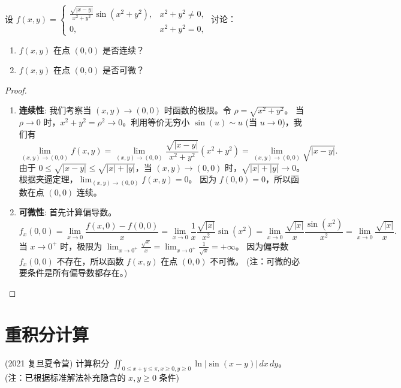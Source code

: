 \documentclass[lang=cn,10pt,thmcnt=section]{elegantbook}
\begin{document}
\begin{example}
    设 $f(x, y) = \begin{cases} \frac{\sqrt{|x - y|}}{x^2 + y^2} \sin(x^2 + y^2), & x^2 + y^2 \neq 0, \\ 0, & x^2 + y^2 = 0, \end{cases}$
讨论：
\begin{enumerate}
\item $f(x, y)$ 在点 $(0, 0)$ 是否连续？
\item $f(x, y)$ 在点 $(0, 0)$ 是否可微？
\end{enumerate}
\end{example}
\begin{proof}
\begin{enumerate}
    \item \textbf{连续性}:
    我们考察当 $(x,y) \to (0,0)$ 时函数的极限。令 $\rho = \sqrt{x^2+y^2}$。
    当 $\rho \to 0$ 时，$x^2+y^2 = \rho^2 \to 0$。利用等价无穷小 $\sin(u) \sim u$ (当 $u\to 0$)，我们有
    \[
    \lim_{(x,y)\to(0,0)} f(x,y) = \lim_{(x,y)\to(0,0)} \frac{\sqrt{|x-y|}}{x^2+y^2} (x^2+y^2) = \lim_{(x,y)\to(0,0)} \sqrt{|x-y|}.
    \]
    由于 $0 \le \sqrt{|x-y|} \le \sqrt{|x|+|y|}$，当 $(x,y)\to(0,0)$ 时，$\sqrt{|x|+|y|} \to 0$。
    根据夹逼定理，$\lim_{(x,y)\to(0,0)} f(x,y) = 0$。
    因为 $f(0,0)=0$，所以函数在点 $(0,0)$ 连续。

    \item \textbf{可微性}:
    首先计算偏导数。
    \[
    f_x(0,0) = \lim_{x\to 0} \frac{f(x,0)-f(0,0)}{x} = \lim_{x\to 0} \frac{1}{x} \frac{\sqrt{|x|}}{x^2}\sin(x^2) = \lim_{x\to 0} \frac{\sqrt{|x|}}{x} \frac{\sin(x^2)}{x^2} = \lim_{x\to 0} \frac{\sqrt{|x|}}{x}.
    \]
    当 $x \to 0^+$ 时，极限为 $\lim_{x\to 0^+} \frac{\sqrt{x}}{x} = \lim_{x\to 0^+} \frac{1}{\sqrt{x}} = +\infty$。
    因为偏导数 $f_x(0,0)$ 不存在，所以函数 $f(x,y)$ 在点 $(0,0)$ 不可微。
    (注：可微的必要条件是所有偏导数都存在。)
\end{enumerate}
\end{proof}


\section{重积分计算}
\begin{example}
    (2021 复旦夏令营) 计算积分 $\iint_{0\le x + y \leq \pi, x \ge 0, y \ge 0} \ln|\sin(x - y)| \, dx \, dy$。
    (注：已根据标准解法补充隐含的 $x,y \ge 0$ 条件)
\end{example}
\end{document}
